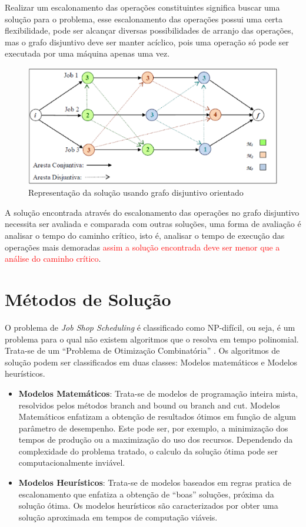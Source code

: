 Realizar um escalonamento das operações constituintes significa buscar uma solução para o problema, esse escalonamento das operações possui uma certa flexibilidade, pode ser alcançar diversas possibilidades de arranjo das operações, mas o grafo disjuntivo deve ser manter acíclico, pois uma operação só pode ser executada por uma máquina apenas uma vez.

\begin{figure}[H]
 \centering
 \includegraphics[scale = 0.6]{graficos/grafo_disjuntivo_orientado.eps}
 \caption{Representação da solução usando grafo disjuntivo orientado}
 \label{grafo_disj_orient}
\end{figure}

A solução encontrada através do escalonamento das operações no grafo disjuntivo necessita ser avaliada e comparada com outras soluções, uma forma de avaliação é analisar o tempo do caminho crítico, isto é, analisar o tempo de execução das operações mais demoradas \textcolor{red}{assim a solução encontrada deve ser menor que a análise do caminho crítico}.

\section{Métodos de Solução} \label{sec:met_sol}
O problema de \textit{Job Shop Scheduling} é classificado como NP-difícil, ou seja, é um problema para o qual não existem algoritmos que o resolva em tempo polinomial. Trata-se de um “Problema de Otimização Combinatória” \cite{SOUZA}.
Os algoritmos de solução podem ser classificados em duas classes:  Modelos matemáticos e Modelos heurísticos.

\begin{itemize}
\item \textbf{Modelos Matemáticos}: Trata-se de modelos de programação inteira mista, resolvidos pelos métodos branch and bound ou branch and cut.  Modelos Matemáticos enfatizam a obtenção de resultados ótimos em função de algum parâmetro de desempenho. Este pode ser, por exemplo, a minimização dos tempos de produção ou a maximização do uso dos recursos. Dependendo da complexidade do problema tratado, o calculo da solução ótima pode ser computacionalmente inviável.

\item \textbf{Modelos Heurísticos}: Trata-se de modelos baseados em regras pratica de escalonamento que enfatiza a obtenção de “boas” soluções, próxima da solução ótima. Os modelos heurísticos são caracterizados por obter uma solução aproximada em tempos de computação viáveis. 
\end{itemize}

